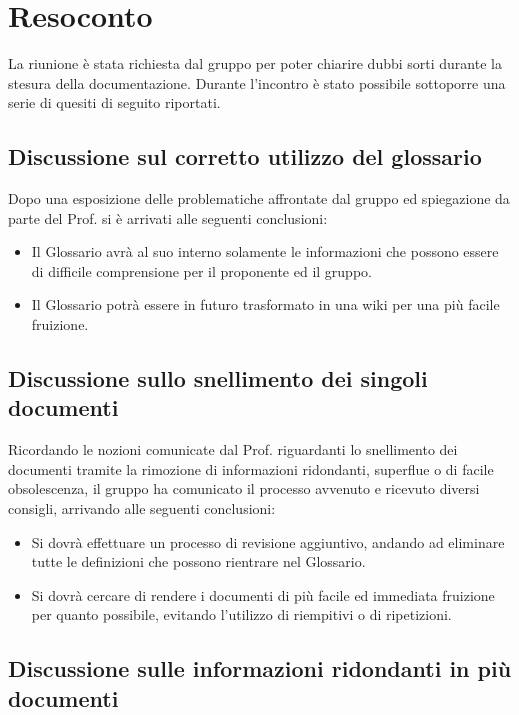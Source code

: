 \newpage


\section{Resoconto}
La riunione è stata richiesta dal gruppo \textit{\Gruppo{}} per poter chiarire dubbi sorti durante la stesura della documentazione.
Durante l'incontro è stato possibile sottoporre una serie di quesiti di seguito riportati.
\subsection{Discussione sul corretto utilizzo del glossario}
Dopo una esposizione delle problematiche affrontate dal gruppo ed spiegazione da parte del Prof. \Tullio{} si è arrivati alle seguenti conclusioni:
\begin{itemize}
	\item Il Glossario avrà al suo interno solamente le informazioni che possono essere di difficile comprensione per il proponente ed il gruppo.
	\item Il Glossario potrà essere in futuro trasformato in una wiki per una più facile fruizione.
\end{itemize}
\subsection{Discussione sullo snellimento dei singoli documenti}
Ricordando le nozioni comunicate dal Prof. \Tullio{} riguardanti lo snellimento dei documenti tramite la rimozione di informazioni ridondanti, superflue o di facile obsolescenza, il gruppo ha comunicato il processo avvenuto e ricevuto diversi consigli, arrivando alle seguenti conclusioni:
\begin{itemize}
	\item Si dovrà effettuare un processo di revisione aggiuntivo, andando ad eliminare tutte le definizioni che possono rientrare nel Glossario.
	\item Si dovrà cercare di rendere i documenti di più facile ed immediata fruizione per quanto possibile, evitando l'utilizzo di riempitivi o di ripetizioni.
\end{itemize}
\subsection{Discussione sulle informazioni ridondanti in più documenti}



\newpage

